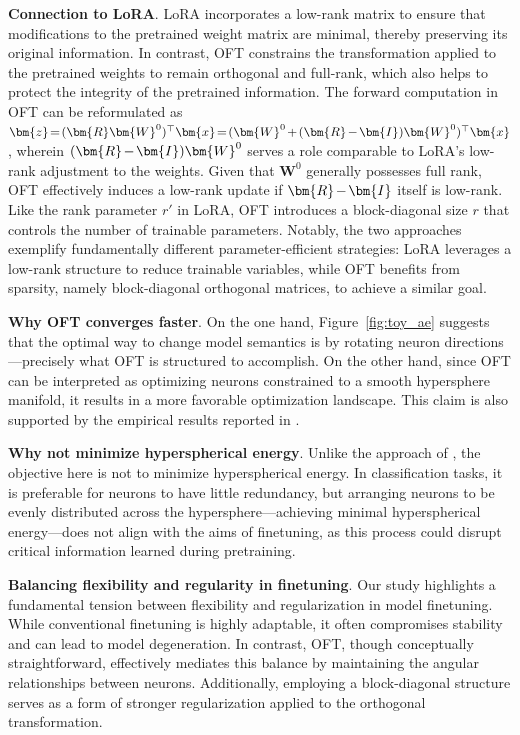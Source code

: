 \textbf{Connection to LoRA}. LoRA incorporates a low-rank matrix to ensure that modifications to the pretrained weight matrix are minimal, thereby preserving its original information. In contrast, OFT constrains the transformation applied to the pretrained weights to remain orthogonal and full-rank, which also helps to protect the integrity of the pretrained information. The forward computation in OFT can be reformulated as $\thickmuskip=2mu \medmuskip=2mu \bm{z}=(\bm{R}\bm{W}^0)^\top\bm{x}=(\bm{W}^0+(\bm{R}-\bm{I})\bm{W}^0)^\top\bm{x}$, wherein $\thickmuskip=2mu \medmuskip=2mu (\bm{R}-\bm{I})\bm{W}^0$ serves a role comparable to LoRA's low-rank adjustment to the weights. Given that $\bm{W}^0$ generally possesses full rank, OFT effectively induces a low-rank update if $\thickmuskip=2mu \medmuskip=2mu \bm{R}-\bm{I}$ itself is low-rank. Like the rank parameter $r'$ in LoRA, OFT introduces a block-diagonal size $r$ that controls the number of trainable parameters. Notably, the two approaches exemplify fundamentally different parameter-efficient strategies: LoRA leverages a low-rank structure to reduce trainable variables, while OFT benefits from sparsity, namely block-diagonal orthogonal matrices, to achieve a similar goal.

\textbf{Why OFT converges faster}. On the one hand, Figure~\ref{fig:toy_ae} suggests that the optimal way to change model semantics is by rotating neuron directions—precisely what OFT is structured to accomplish. On the other hand, since OFT can be interpreted as optimizing neurons constrained to a smooth hypersphere manifold, it results in a more favorable optimization landscape. This claim is also supported by the empirical results reported in \cite{liu2021orthogonal}.

\textbf{Why not minimize hyperspherical energy}. Unlike the approach of \cite{liu2021orthogonal}, the objective here is not to minimize hyperspherical energy. In classification tasks, it is preferable for neurons to have little redundancy, but arranging neurons to be evenly distributed across the hypersphere—achieving minimal hyperspherical energy—does not align with the aims of finetuning, as this process could disrupt critical information learned during pretraining.

\textbf{Balancing flexibility and regularity in finetuning}. Our study highlights a fundamental tension between flexibility and regularization in model finetuning. While conventional finetuning is highly adaptable, it often compromises stability and can lead to model degeneration. In contrast, OFT, though conceptually straightforward, effectively mediates this balance by maintaining the angular relationships between neurons. Additionally, employing a block-diagonal structure serves as a form of stronger regularization applied to the orthogonal transformation.

